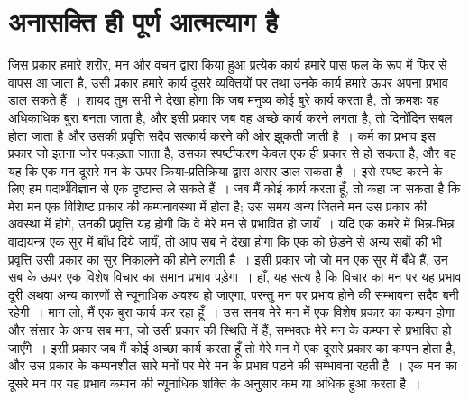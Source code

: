 
\chapter{अनासक्ति ही पूर्ण आत्मत्याग है}

जिस प्रकार हमारे शरीर, मन और वचन द्वारा किया हुआ प्रत्येक कार्य हमारे पास फल के रूप में फिर से वापस आ जाता है, उसी प्रकार हमारे कार्य दूसरे व्यक्तियों पर तथा उनके कार्य हमारे ऊपर अपना प्रभाव डाल सकते हैं~। शायद तुम सभी ने देखा होगा कि जब मनुष्य कोई बुरे कार्य करता है, तो क्रमशः वह अधिकाधिक बुरा बनता जाता है, और इसी प्रकार जब वह अच्छे कार्य करने लगता है, तो दिनोंदिन सबल होता जाता है और उसकी प्रवृत्ति सदैव सत्कार्य करने की ओर झुकती जाती है~। कर्म का प्रभाव इस प्रकार जो इतना जोर पकड़ता जाता है, उसका स्पष्टीकरण केवल एक ही प्रकार से हो सकता है, और वह यह कि एक मन दूसरे मन के ऊपर क्रिया-प्रतिक्रिया द्वारा असर डाल सकता है~। इसे स्पष्ट करने के लिए हम पदार्थविज्ञान से एक दृष्टान्त ले सकते हैं~। जब मैं कोई कार्य करता हूँ, तो कहा जा सकता है कि मेरा मन एक विशिष्ट प्रकार की कम्पनावस्था में होता है; उस समय अन्य जितने मन उस प्रकार की अवस्था में होगे, उनकी प्रवृत्ति यह होगी कि वे मेरे मन से प्रभावित हो जायँ~। यदि एक कमरे में भिन्न-भिन्न वाद्ययन्त्र एक सुर में बाँध दिये जायँ, तो आप सब ने देखा होगा कि एक को छेड़ने से अन्य सबों की भी प्रवृत्ति उसी प्रकार का सुर निकालने की होने लगती है~। इसी प्रकार जो जो मन एक सुर में बँधे हैं, उन सब के ऊपर एक विशेष विचार का समान प्रभाव पड़ेगा~। हाँ, यह सत्य है कि विचार का मन पर यह प्रभाव दूरी अथवा अन्य कारणों से न्यूनाधिक अवश्य हो जाएगा, परन्तु मन पर प्रभाव होने की सम्भावना सदैव बनी रहेगी~। मान लो, मैं एक बुरा कार्य कर रहा हूँ~। उस समय मेरे मन में एक विशेष प्रकार का कम्पन होगा और संसार के अन्य सब मन, जो उसी प्रकार की स्थिति में हैं, सम्भवतः मेरे मन के कम्पन से प्रभावित हो जाएँगे~। इसी प्रकार जब मैं कोई अच्छा कार्य करता हूँ तो मेरे मन में एक दूसरे प्रकार का कम्पन होता है, और उस प्रकार के कम्पनशील सारे मनों पर मेरे मन के प्रभाव पड़ने की सम्भावना रहती है~। एक मन का दूसरे मन पर यह प्रभाव कम्पन की न्यूनाधिक शक्ति के अनुसार कम या अधिक हुआ करता है~।

